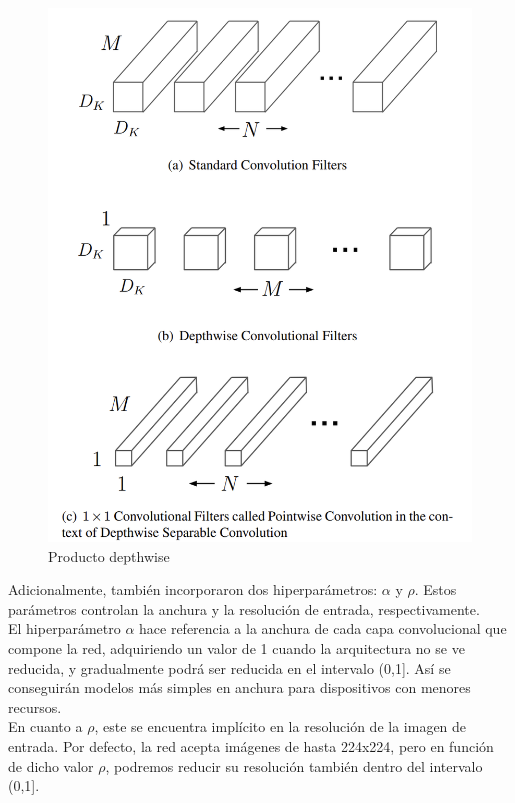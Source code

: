 \begin{figure}[H]
	\label{depthwise}
	\centering
	\includegraphics[scale = 0.225]{imagenes/depthwise.png}
	\caption{Producto depthwise}
\end{figure}

Adicionalmente, también incorporaron dos hiperparámetros: $\alpha$ y $\rho$. Estos parámetros controlan la anchura y la resolución de entrada, respectivamente.\\
El hiperparámetro $\alpha$ hace referencia a la anchura de cada capa convolucional que compone la red, adquiriendo un valor de 1 cuando la arquitectura no se ve reducida, y gradualmente podrá ser reducida en el intervalo (0,1]. Así se conseguirán modelos más simples en anchura para dispositivos con menores recursos.\\

En cuanto a $\rho$, este se encuentra implícito en la resolución de la imagen de entrada. Por defecto, la red acepta imágenes de hasta 224x224, pero en función de dicho valor $\rho$, podremos reducir su resolución también dentro del intervalo (0,1].\\

